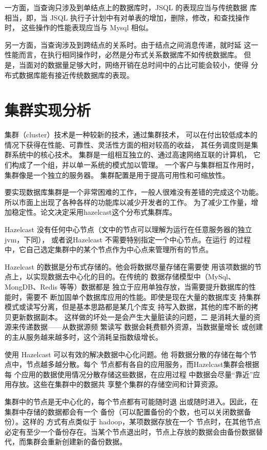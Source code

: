 一方面，当查询只涉及到单结点上的数据库时，JSQL 的表现应当与传统数据
库相当，即，当 JSQL 执行子计划中有对单表的增加，删除，修改，和查找操作时，
这些操作的性能表现应当与 Mysql 相似。

另一方面，当查询涉及到跨结点的关系时。由于结点之间消息传递，就时延
这一性能而言，在执行相同操作时，必然是分布式关系数据库不如传统数据库。
但是，当面对的数据量足够大时，网络开销在总时间中的占比可能会较小，使得
分布式数据库能有接近传统数据库的表现。
\section{集群实现分析}
集群（cluster）技术是一种较新的技术，通过集群技术，
可以在付出较低成本的情况下获得在性能、可靠性、灵活性方面的相对较高的收益，
其任务调度则是集群系统中的核心技术。
集群是一组相互独立的、通过高速网络互联的计算机，
它们构成了一个组，并以单一系统的模式加以管理。
一个客户与集群相互作用时，集群像是一个独立的服务器。
集群配置是用于提高可用性和可缩放性。

要实现数据库集群是一个非常困难的工作，一般人很难没有差错的完成这个功能。
所以市面上出现了各种各样的功能库以减少开发者的工作。
为了减少工作量，增加稳定性。论文决定采用hazelcast这个分布式集群库。

Hazelcast 没有任何中心节点（文中的节点可以理解为运行在任意服务器的独立jvm，下同），
或者说Hazelcast 不需要特别指定一个中心节点。在运行
的过程中，它自己选定集群中的某个节点作为中心点来管理所有的节点。

 Hazelcast 的数据是分布式存储的。他会将数据尽量存储在需要使
 用该项数据的节点上，以实现数据去中心化的目的。在传统的
 数据存储模型中（MySql、MongDB、Redis 等等）数据都是
 独立于应用单独存放，当需要提升数据库的性能时，需要不
 断加固单个数据库应用的性能。即使是现在大量的数据库支
 持集群模式或读写分离，但是基本思路都是某几个库支
 持写入数据，其他的库不断的拷贝更新数据副本。
 这样做的坏处一是会产生大量脏读的问题，二
 是消耗大量的资源来传递数据——从数据源频
 繁读写
 数据会耗费额外资源，当数据量增长
 或创建的主从服务越来越多时，这个消耗呈指数级增长。

使用 Hazelcast 可以有效的解决数据中心化问题。他
将数据分散的存储在每个节点中，节点越多越分散。每个
节点都有各自的应用服务，而Hazelcast集群会根据每
个应用的数据使用情况分散存储这些数据，在应用过程
中数据会尽量“靠近”应用存放。这些在集群中的数据共
享整个集群的存储空间和计算资源。

  集群中的节点是无中心化的，每个节点都有可能随时退
  出或随时进入。因此，在集群中存储的数据都会有一个
  备份（可以配置备份的个数，也可以关闭数据备份）。这样的
  方式有点类似于 hadoop，某项数据存放在一个
  节点时，在其他节点必定有至少一个备份存在。当某个节点退出时，节点上存放的数据会由备份数据替
  代，而集群会重新创建新的备份数据。
  
